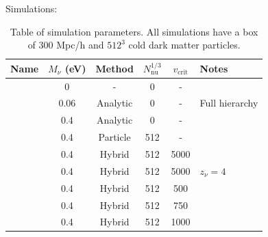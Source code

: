 \documentclass[useAMS, usenatbib]{mnras}
\begin{document}
Simulations:
\begin{table}
\begin{center}
\begin{tabular}{|l|c|c|c|c|l|}
\hline
    Name & $M_\nu$ (eV) & Method & $N_\mathrm{nu}^{1/3}$ & $v_\mathrm{crit}$ & Notes \\
\hline
    &       0             &    -          & 0         & - &    \\
    &     0.06            &   Analytic    & 0         & - &  Full hierarchy  \\
    &     0.4             &   Analytic    & 0         & - &    \\
    &     0.4             &   Particle    & 512       & - &    \\
    &     0.4             &   Hybrid      & 512       & 5000 & \\
    &     0.4             &   Hybrid      & 512       & 5000 & $z_\nu = 4$  \\
    &     0.4             &   Hybrid      & 512       & 500 &    \\
    &     0.4             &   Hybrid      & 512       & 750 & \\
    &     0.4             &   Hybrid      & 512       & 1000 & \\
\hline
\end{tabular}
\end{center}
\caption{Table of simulation parameters. All simulations have a box of $300$ Mpc/h
and $512^3$ cold dark matter particles.
}
\label{tab:simulations}
\end{table}
\end{document}
